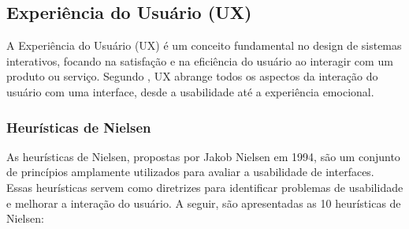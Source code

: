 \subsection{Experiência do Usuário (UX)}
A Experiência do Usuário (UX) é um conceito fundamental no design de sistemas interativos, focando na satisfação e na eficiência do usuário ao interagir com um produto ou serviço. Segundo \cite{Norman}, UX abrange todos os aspectos da interação do usuário com uma interface, desde a usabilidade até a experiência emocional.

\subsubsection{Heurísticas de Nielsen}
As heurísticas de Nielsen, propostas por Jakob Nielsen em 1994, são um conjunto de princípios amplamente utilizados para avaliar a usabilidade de interfaces. Essas heurísticas servem como diretrizes para identificar problemas de usabilidade e melhorar a interação do usuário. A seguir, são apresentadas as 10 heurísticas de Nielsen:

